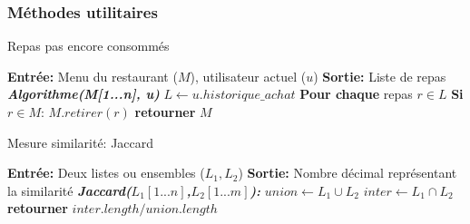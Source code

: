 \documentclass[11pt]{article}
\begin{document}
\subsubsection{Méthodes utilitaires}
\begin{algorithm}
    \caption{Repas pas encore consommés}
    \begin{algorithmic}[1]
    \Statex \textbf{Entrée:} Menu du restaurant ($M$), utilisateur actuel ($u$)
    \Statex \textbf{Sortie:} Liste de repas
    \State \textbf{\textit{Algorithme(M[1...n], u)}}
    \State \hspace{0.5cm} $L \leftarrow u.historique\_achat$
    \State \hspace{0.5cm} \textbf{Pour chaque} repas $r \in L$
    \State \hspace{1cm} \textbf{Si} $r \in M$:
    \State \hspace{1.5cm} $M.retirer(r)$
    \State \hspace{0.5cm} \textbf{retourner} $M$
    \end{algorithmic}
\end{algorithm}

\begin{algorithm}
    \caption{Mesure similarité: Jaccard}
    \begin{algorithmic}[1]
    \Statex \textbf{Entrée:} Deux listes ou ensembles ($L_1, L_2$)
    \Statex \textbf{Sortie:} Nombre décimal représentant la similarité
    \State \textbf{\textit{Jaccard($L_1[1...n]$,$L_2[1...m]$):}}
    \State \hspace{0.5cm} $union \leftarrow L_1 \cup L_2$
    \State \hspace{0.5cm} $inter \leftarrow L_1 \cap L_2$
    \State \hspace{0.5cm} \textbf{retourner} $inter.length/union.length$
    \end{algorithmic}
\end{algorithm}
\end{document}
